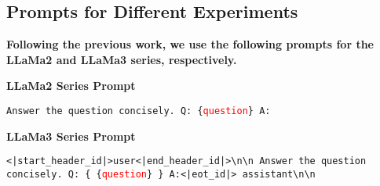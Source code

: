 \subsection{Prompts for Different Experiments}
\begin{tcolorbox}[colback=white, colframe=black, coltitle=white, colbacktitle=black,
    title={Prompt for Response Reliability Estimation}, boxrule=0.5mm, sharp corners]

    \noindent \textbf{Following the previous work, we use the following prompts for the LLaMa2 and LLaMa3 series, respectively.}

    \vspace{10pt}

    \noindent \textbf{LLaMa2 Series Prompt} 
    
    \noindent \texttt{Answer the question concisely. Q: \{\textcolor{red}{question}\} A:}

    \vspace{10pt}

    \noindent \textbf{LLaMa3 Series Prompt}

    \noindent \texttt{<|start\_header\_id|>user<|end\_header\_id|>\textbackslash n\textbackslash n Answer the question concisely. Q: \{ \{\textcolor{red}{question}\} \} A:<|eot\_id|> assistant\textbackslash n\textbackslash n}
 

\end{tcolorbox}
